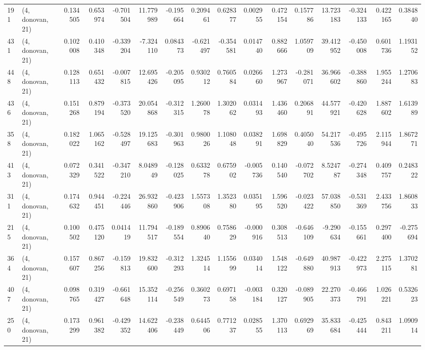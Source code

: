 \begin{tabular}{llrrrrrrrrrrrrrr}
191 &  (4, donovan, 21) &   0.134505 &  0.653974 & -0.701504 &   11.779989 & -0.195664 &   0.209461 &  0.628377 &  0.002955 &  0.472154 &  0.157786 &   13.723183 & -0.324133 &  0.422165 &  0.384840 \\
431 &  (4, donovan, 21) &   0.102008 &  0.410348 & -0.339204 &   -7.324110 &  0.084373 &  -0.621497 & -0.354581 &  0.014740 &  0.882666 &  1.059709 &   39.412952 & -0.450008 &  0.601736 &  1.193152 \\
448 &  (4, donovan, 21) &   0.128113 &  0.651432 & -0.007815 &   12.695426 & -0.205095 &   0.930212 &  0.760584 &  0.026660 &  1.273967 & -0.281071 &   36.966602 & -0.388860 &  1.955244 &  1.270683 \\
436 &  (4, donovan, 21) &   0.151268 &  0.879194 & -0.373520 &   20.054868 & -0.312315 &   1.260078 &  1.302062 &  0.031493 &  1.436460 &  0.206891 &   44.577921 & -0.420628 &  1.887602 &  1.613989 \\
358 &  (4, donovan, 21) &   0.182022 &  1.065162 & -0.528497 &   19.125683 & -0.301963 &   0.980026 &  1.108048 &  0.038291 &  1.698829 &  0.405040 &   54.217536 & -0.495726 &  2.115944 &  1.867271 \\
413 &  (4, donovan, 21) &   0.072329 &  0.341522 & -0.347210 &    8.048949 & -0.128025 &   0.633278 &  0.675902 & -0.005736 &  0.140540 & -0.072702 &    8.524787 & -0.274348 &  0.409757 &  0.248322 \\
311 &  (4, donovan, 21) &   0.174632 &  0.944451 & -0.224446 &   26.932860 & -0.423906 &   1.557308 &  1.352380 &  0.035195 &  1.596520 & -0.023422 &   57.038850 & -0.531369 &  2.433756 &  1.860833 \\
215 &  (4, donovan, 21) &   0.100502 &  0.475120 &  0.041419 &   11.794517 & -0.189554 &   0.890640 &  0.758629 & -0.000916 &  0.308513 & -0.646109 &   -9.290634 & -0.155661 &  0.297400 & -0.275694 \\
364 &  (4, donovan, 21) &   0.157607 &  0.867256 & -0.159813 &   19.832600 & -0.312293 &   1.324514 &  1.155699 &  0.034014 &  1.548122 & -0.649880 &   40.987913 & -0.422973 &  2.275115 &  1.370281 \\
407 &  (4, donovan, 21) &   0.098765 &  0.319427 & -0.661648 &   15.352114 & -0.256549 &   0.360273 &  0.697158 & -0.003184 &  0.320127 & -0.089905 &   22.270373 & -0.466791 &  1.026221 &  0.532623 \\
250 &  (4, donovan, 21) &   0.173299 &  0.961382 & -0.429352 &   14.622406 & -0.238449 &   0.644506 &  0.771237 &  0.028555 &  1.370113 &  0.692969 &   35.833684 & -0.425444 &  0.843211 &  1.090914 \\

\end{tabular}
